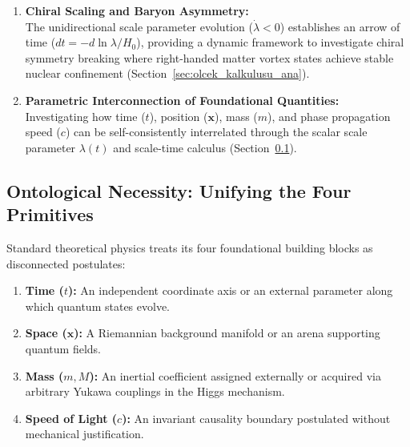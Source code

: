 \begin{enumerate}
      \item \textbf{Chiral Scaling and Baryon Asymmetry:} \\
            The unidirectional scale parameter evolution ($\dot{\lambda} < 0$) establishes an arrow of time ($dt = -d\ln\lambda/H_0$), providing a dynamic framework to investigate chiral symmetry breaking where right-handed matter vortex states achieve stable nuclear confinement (Section~\ref{sec:olcek_kalkulusu_ana}).

      \item \textbf{Parametric Interconnection of Foundational Quantities:} \\
            Investigating how time ($t$), position ($\mathbf{x}$), mass ($m$), and phase propagation speed ($c$) can be self-consistently interrelated through the scalar scale parameter $\lambda(t)$ and scale-time calculus (Section~\ref{sec:ontolojik_indirgeme}).
\end{enumerate}

\subsection{Ontological Necessity: Unifying the Four Primitives}
\label{sec:ontolojik_indirgeme}

Standard theoretical physics treats its four foundational building blocks as disconnected postulates:
\begin{enumerate}
      \item \textbf{Time ($t$):} An independent coordinate axis or an external parameter along which quantum states evolve.
      \item \textbf{Space ($\mathbf{x}$):} A Riemannian background manifold or an arena supporting quantum fields.
      \item \textbf{Mass ($m, M$):} An inertial coefficient assigned externally or acquired via arbitrary Yukawa couplings in the Higgs mechanism.
      \item \textbf{Speed of Light ($c$):} An invariant causality boundary postulated without mechanical justification.
\end{enumerate}

